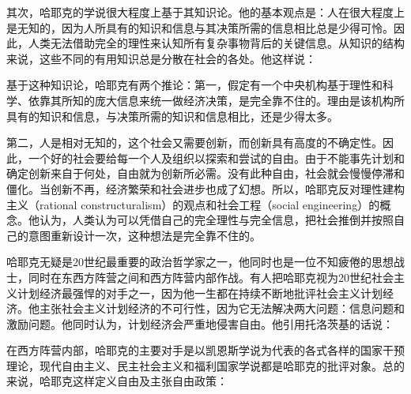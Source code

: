 其次，哈耶克的学说很大程度上基于其知识论。他的基本观点是：人在很大程度上是无知的，因为人所具有的知识和信息与其决策所需的信息相比总是少得可怜。因此，人类无法借助完全的理性来认知所有复杂事物背后的关键信息。从知识的结构来说，这些不同的有用知识总是分散在社会的各处。他这样说：


基于这种知识论，哈耶克有两个推论：第一，假定有一个中央机构基于理性和科学、依靠其所知的庞大信息来统一做经济决策，是完全靠不住的。理由是该机构所具有的知识和信息，与决策所需的知识和信息相比，还是少得太多。

第二，人是相对无知的，这个社会又需要创新，而创新具有高度的不确定性。因此，一个好的社会要给每一个人及组织以探索和尝试的自由。由于不能事先计划和确定创新来自于何处，自由就为创新所必需。没有此种自由，社会就会慢慢停滞和僵化。当创新不再，经济繁荣和社会进步也成了幻想。所以，哈耶克反对理性建构主义（rational constructuralism）的观点和社会工程（social engineering）的概念。他认为，人类认为可以凭借自己的完全理性与完全信息，把社会推倒并按照自己的意图重新设计一次，这种想法是完全靠不住的。

哈耶克无疑是20世纪最重要的政治哲学家之一，他同时也是一位不知疲倦的思想战士，同时在东西方阵营之间和西方阵营内部作战。有人把哈耶克视为20世纪社会主义计划经济最强悍的对手之一，因为他一生都在持续不断地批评社会主义计划经济。他主张社会主义计划经济的不可行性，因为它无法解决两大问题：信息问题和激励问题。他同时认为，计划经济会严重地侵害自由。他引用托洛茨基的话说：


在西方阵营内部，哈耶克的主要对手是以凯恩斯学说为代表的各式各样的国家干预理论，现代自由主义、民主社会主义和福利国家学说都是哈耶克的批评对象。总的来说，哈耶克这样定义自由及主张自由政策：


